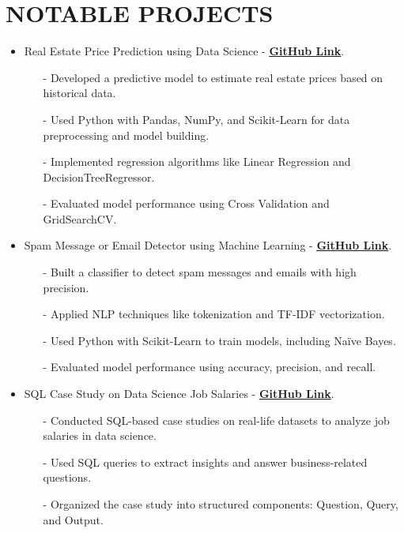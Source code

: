 \documentclass[letterpaper,11pt]{article}
\begin{document}
\section*{\textbf{NOTABLE PROJECTS}}
\begin{itemize}[left=0cm]
    \setlength\itemsep{-0.075em} %
    \setlength\parskip{-0.075em} %

    \item Real Estate Price Prediction using Data Science - \href{https://github.com/ShahidulHaqueShaheeen/Real_Estate_Price_Prediction.git}{\underline{\textbf{GitHub Link}}}.
    \begin{itemize}[left=0cm]
        \item[-] \small \justifying Developed a predictive model to estimate real estate prices based on historical data.
        \item[-] \small \justifying Used Python with Pandas, NumPy, and Scikit-Learn for data preprocessing and model building.
        \item[-] \small \justifying Implemented regression algorithms like Linear Regression and DecisionTreeRegressor.
        \item[-] \small \justifying Evaluated model performance using Cross Validation and GridSearchCV.
    \end{itemize}
    
    \item Spam Message or Email Detector using Machine Learning - \href{https://github.com/ShahidulHaqueShaheeen/Spam_MessageOrMail_Detector.git}{\underline{\textbf{GitHub Link}}}.
    \begin{itemize}[left=0cm]
        \item[-] \small \justifying Built a classifier to detect spam messages and emails with high precision.
        \item[-] \small \justifying Applied NLP techniques like tokenization and TF-IDF vectorization.
        \item[-] \small \justifying Used Python with Scikit-Learn to train models, including Naïve Bayes.
        \item[-] \small \justifying Evaluated model performance using accuracy, precision, and recall.
    \end{itemize}

    \item SQL Case Study on Data Science Job Salaries - \href{https://github.com/YOUR_GITHUB_LINK}{\underline{\textbf{GitHub Link}}}.
    \begin{itemize}[left=0cm]
        \item[-] \small \justifying Conducted SQL-based case studies on real-life datasets to analyze job salaries in data science.
        \item[-] \small \justifying Used SQL queries to extract insights and answer business-related questions.
        \item[-] \small \justifying Organized the case study into structured components: Question, Query, and Output.
    \end{itemize}


\end{itemize}
\end{document}
